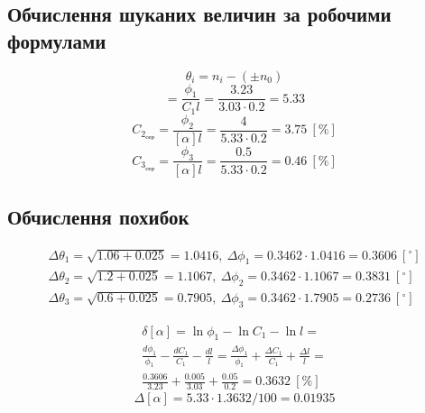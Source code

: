 \documentclass[12pt]{article}
\begin{document}
\begin{center}

\subsection*{Обчислення шуканих величин за робочими формулами}
	\begin{equation}
		\theta_i=n_i-(\pm n_0)
	\end{equation}
	\begin{equation}
		[\alpha]=\frac{\phi_1}{C_1l}=\frac{3.23}{3.03\cdot0.2}=5.33
	\end{equation}
	\begin{equation}
		C_{2_\text{сер}}=\frac{\phi_2}{[\alpha]l}=\frac{4}{5.33\cdot0.2}=3.75~[\%]
	\end{equation}
	\begin{equation}
		C_{3_\text{сер}}=\frac{\phi_3}{[\alpha]l}=\frac{0.5}{5.33\cdot0.2}=0.46~[\%]
	\end{equation}

\subsection*{Обчислення похибок}
	\begin{align}
	\Delta \theta_1=\sqrt{1.06+0.025}=1.0416,~
	\Delta \phi_1=0.3462\cdot 1.0416=0.3606~[^\circ]\\
	\Delta \theta_2=\sqrt{1.2+0.025}=1.1067,~
	\Delta \phi_2=0.3462\cdot 1.1067=0.3831~[^\circ]\\
	\Delta \theta_3=\sqrt{0.6+0.025}=0.7905,~
	\Delta \phi_3=0.3462\cdot 1.7905=0.2736~[^\circ]
	\end{align}

\begin{equation}
	\begin{aligned}
	\delta [\alpha]=\ln{\phi_1}-\ln C_1-\ln l=\\
	\frac{d\phi_1}{\phi_1}-\frac{dC_1}{C_1}-\frac{dl}{l}=
	\frac{\Delta\phi_1}{\phi_1}+\frac{\Delta C_1}{C_1}+\frac{\Delta l}{l}=\\
	\frac{0.3606}{3.23}+\frac{0.005}{3.03}+\frac{0.05}{0.2}=0.3632~[\%]
	\end{aligned}
\end{equation}
\begin{equation}
	\Delta [\alpha]=5.33\cdot 1.3632/100=0.01935
\end{equation}


\end{center}
\end{document}
